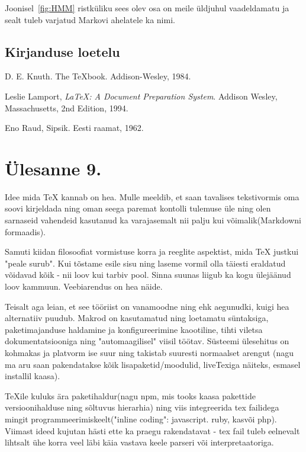 \documentclass[a4paper,fleqn,12pt]{article}
\theoremstyle{definition}
\begin{document}
Joonisel~\ref{fig:HMM} ristküliku sees olev osa on meile üldjuhul vaadeldamatu ja sealt tuleb varjatud Markovi ahelatele ka nimi.

\subsection{Kirjanduse loetelu}

\begin{thebibliography}{99}

 D. E. Knuth. The {\TeX}book.
Addison-Wesley, 1984.

 Leslie Lamport,
	\emph{\LaTeX: A Document Preparation System}.
	Addison Wesley, Massachusetts,
	2nd Edition,
	1994.

 Eno Raud,
  Sipsik.
  Eesti raamat,
  1962.
\end{thebibliography}

\section{Ülesanne 9.}

Idee mida \TeX{} kannab on hea. Mulle meeldib, et saan tavalises tekstivormis oma soovi kirjeldada ning oman seega paremat kontolli tulemuse üle ning olen sarnaseid vahendeid kasutanud ka varajasemalt nii palju kui võimalik(Mark\-downi formaadis).

Samuti kiidan filosoofiat vormistuse korra ja reeglite aspektist, mida \TeX{} justkui "peale surub". Kui tõstame esile sisu ning laseme vormil olla täiesti eraldatud võidavad kõik - nii loov kui tarbiv pool. Sinna suunas liigub ka kogu ülejäänud loov kammuun. Veebiarendus on hea näide.

Teisalt aga leian, et see tööriist on vanamoodne ning ehk aegunudki, kuigi hea alternatiiv puudub. Makrod on kasutamatud ning loetamatu süntaksiga, paketimajanduse haldamine ja konfigureerimine kaootiline, tihti viletsa dokumentatsiooniga ning "automaagilisel" viisil töötav. Süsteemi ülesehitus on kohmakas ja platvorm ise suur ning takistab suuresti normaalset arengut (nagu ma aru saan pakendatakse kõik lisapaketid/moodulid, liveTexiga näiteks, esmasel installil kaasa).

\TeX ile kuluks ära paketihaldur(nagu npm, mis tooks kaasa pakettide versioonihalduse ning sõltuvus hierarhia) ning viis integreerida tex failidega mingit programmeerimiskeelt("inline coding": javascript. ruby, kasvõi php). Viimast ideed kujutan hästi ette ka praegu rakendatavat - tex fail tuleb eelnevalt lihtsalt ühe korra veel läbi käia vastava keele parseri või interpretaatoriga.
\end{document}
